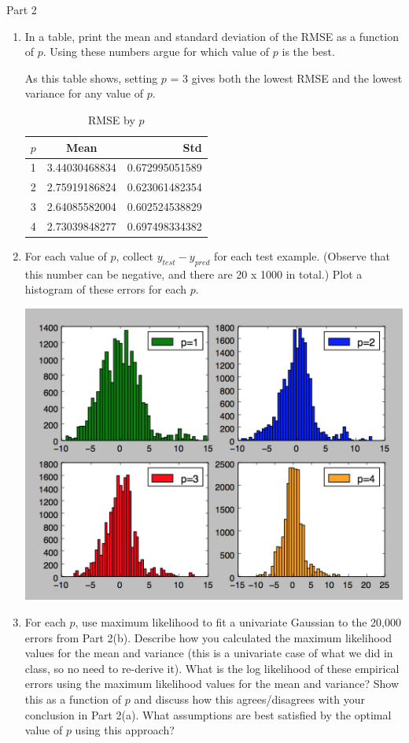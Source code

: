 \documentclass[11pt]{article}
\begin{document}
Part 2
\begin{enumerate}
\item In a table, print the mean and standard deviation of the RMSE as a function of $p$. Using these numbers argue for which value of $p$ is the best.

As this table shows, setting $p$ = 3 gives both the lowest RMSE and the lowest variance for any value of $p$.

\begin{table}[!th]
\centering
\begin{tabular}{|l|c|r|}
\hline
$p$ & Mean & Std \\
\hline
1 & 3.44030468834 & 0.672995051589 \\
2 & 2.75919186824 & 0.623061482354 \\
3 & 2.64085582004 & 0.602524538829 \\
4 & 2.73039848277 & 0.697498334382 \\
\hline
\end{tabular}
\caption{RMSE by $p$}
\label{ex:table}
\end{table}

\item For each value of $p$, collect $y_{test} - y_{pred}$ for each test example. (Observe that this number can be negative, and there are 20 x 1000 in total.) Plot a histogram of these errors for each $p$.

\includegraphics[scale=0.8]{errors_hist.png}


\item For each $p$, use maximum likelihood to fit a univariate Gaussian to the 20,000 errors from Part 2(b). Describe how you calculated the maximum likelihood values for the mean and variance (this is a univariate case of what we did in class, so no need to re-derive it). What is the log likelihood of these empirical errors using the maximum likelihood values for the mean and variance? Show this as a function of $p$ and discuss how this agrees/disagrees with your conclusion in Part 2(a). What assumptions are best satisfied by the optimal value of $p$ using this approach?


\end{enumerate}
\end{document}
